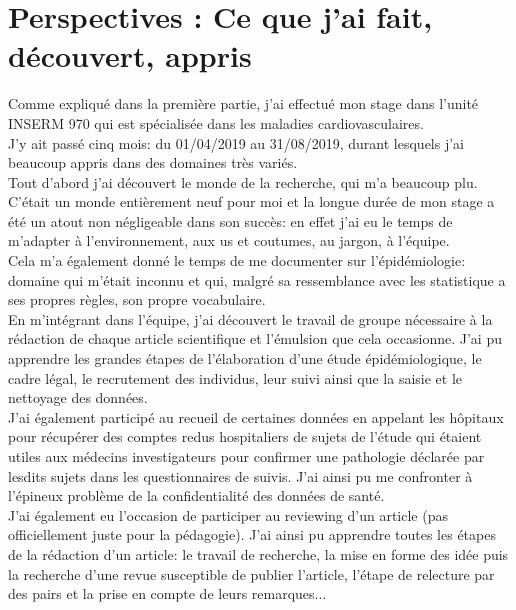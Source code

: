 \documentclass{book}
\begin{document}
\newpage
\section{Perspectives : Ce que j'ai fait, découvert, appris}

\noindent
Comme expliqué dans la première partie, j'ai effectué mon stage dans l'unité INSERM 970 qui est spécialisée dans les maladies cardiovasculaires.\\
J'y ait passé cinq mois: du 01/04/2019 au 31/08/2019, durant lesquels j'ai beaucoup appris dans des domaines très variés.\\

\bigskip
\noindent
Tout d'abord j'ai découvert le monde de la recherche, qui m'a beaucoup plu. C'était un monde entièrement neuf pour moi et la longue durée de mon stage a été un atout non négligeable dans son succès: en effet j'ai eu le temps de m'adapter à l'environnement, aux us et coutumes, au jargon, à l'équipe.\\
\bigskip
\noindent
Cela m'a également donné le temps de me documenter sur l'épidémiologie: domaine qui m'était inconnu et qui, malgré sa ressemblance avec les statistique a ses propres règles, son propre vocabulaire.\\
\bigskip
\noindent
En m'intégrant dans l'équipe, j'ai découvert le travail de groupe nécessaire à la rédaction de chaque article scientifique et l'émulsion que cela occasionne.
J'ai pu apprendre les grandes étapes de l'élaboration d'une étude épidémiologique, le cadre légal, le recrutement des individus, leur suivi ainsi que la saisie et le nettoyage des données.\\
\noindent
J'ai également participé au recueil de certaines données en appelant les hôpitaux pour récupérer des comptes redus hospitaliers de sujets de l'étude qui étaient utiles aux médecins investigateurs pour confirmer une pathologie déclarée par lesdits sujets dans les questionnaires de suivis. J'ai ainsi pu me confronter à l'épineux problème de la confidentialité des données de santé.\\

\bigskip
\noindent
J'ai également eu l'occasion de participer au reviewing d'un article (pas officiellement juste pour la pédagogie). J'ai ainsi pu apprendre toutes les étapes de la rédaction d'un article: le travail de recherche, la mise en forme des idée puis la recherche d'une revue susceptible de publier l'article, l'étape de relecture par des pairs et la prise en compte de leurs remarques...\\
\end{document}
